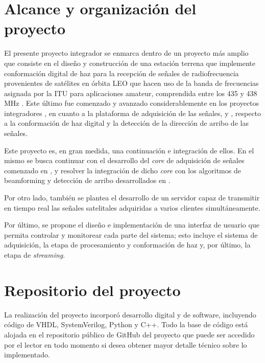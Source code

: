 \documentclass[../../main.tex]{subfiles}
\begin{document}

\section{Alcance y organización del proyecto}
El presente proyecto integrador se enmarca dentro de un proyecto más amplio que consiste en el diseño y construcción de una estación terrena que implemente conformación digital de haz 
para la recepción de señales de radiofrecuencia provenientes de satélites en órbita LEO que hacen uso de la banda de frecuencias asignada por la ITU para aplicaciones amateur, comprendida entre los 435 y 438 MHz \cite{itu-banda-amateur}.
Este último fue comenzado y avanzado considerablemente en los proyectos integradores \cite{proyecto-jose}, en cuanto a la plataforma de adquisición de las señales, y \cite{proyecto-grigo}, respecto a la conformación de haz digital y la detección de la dirección de arribo de las señales. 

Este proyecto es, en gran medida, una continuación e integración de ellos. En el mismo se busca continuar con el desarrollo del \textit{core} de adquisición de señales comenzado en \cite{proyecto-jose}, y resolver la integración de dicho \textit{core} con los algoritmos de beamforming y detección de arribo desarrollados en \cite{proyecto-grigo}.

Por otro lado, también se plantea el desarrollo de un servidor capaz de transmitir en tiempo real las señales satelitales adquiridas a varios clientes simultáneamente.

Por último, se propone el diseño e implementación de una interfaz de usuario que permita controlar y monitorear cada parte del sistema; esto incluye el sistema de adquisición, la etapa de procesamiento y conformación de haz y, por último, la etapa de \textit{streaming}.

\section{Repositorio del proyecto}
La realización del proyecto incorporó desarrollo digital y de software, incluyendo código de VHDL, SystemVerilog, Python y C++. Todo la base de código está alojada en el repositorio público de GitHub del proyecto \cite{github} que puede ser accedido por el lector en todo momento si desea obtener mayor detalle técnico sobre lo implementado.
\end{document}

